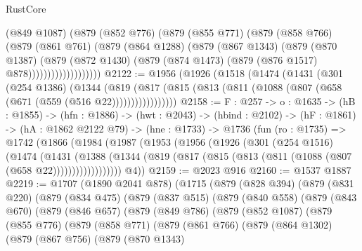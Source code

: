 \begin{lexlean}{RustCore}
\begin{coremodule}
                      (@849 @1087)
                      (@879
                        (@852 @776)
                        (@879
                          (@855 @771)
                          (@879
                            (@858 @766)
                            (@879
                              (@861 @761)
                              (@879
                                (@864 @1288)
                                (@879
                                  (@867 @1343)
                                  (@879
                                    (@870 @1387)
                                    (@879
                                      (@872 @1430)
                                      (@879 (@874 @1473) (@879 (@876 @1517) @878)))))))))))))))))))
@2122 := @1956
    (@1926
      (@1518
        (@1474
          (@1431
            (@301
              (@254 @1386)
              (@1344
                (@819
                  (@817 (@815 (@813 (@811 (@1088 (@807 (@658 (@671 (@559 (@516 @22)))))))))))))))))
@2158 := {F : @257} ->
  {o : @1635} ->
  (hB : @1855) ->
  (hfn : @1886) ->
  (hwt : @2043) ->
  (hbind : @2102) ->
  (hF : @1861) ->
  (hA : @1862 @2122 @79) ->
  (hne : @1733) ->
  @1736
    (fun (ro : @1735) =>
    @1742
      (@1866
        (@1984
          (@1987
            (@1953
              (@1956
                (@1926
                  (@301
                    (@254 @1516)
                    (@1474
                      (@1431
                        (@1388
                          (@1344
                            (@819 (@817 (@815 (@813 (@811 (@1088 (@807 (@658 @22))))))))))))))))))
        @4))
@2159 := @2023 @916
@2160 := @1537 @1887
@2219 := @1707
    (@1890 @2041 @878)
    (@1715
      (@879
        (@828 @394)
        (@879
          (@831 @220)
          (@879
            (@834 @475)
            (@879
              (@837 @515)
              (@879
                (@840 @558)
                (@879
                  (@843 @670)
                  (@879
                    (@846 @657)
                    (@879
                      (@849 @786)
                      (@879
                        (@852 @1087)
                        (@879
                          (@855 @776)
                          (@879
                            (@858 @771)
                            (@879
                              (@861 @766)
                              (@879
                                (@864 @1302)
                                (@879
                                  (@867 @756)
                                  (@879
                                    (@870 @1343)

\end{coremodule}
\end{lexlean}
